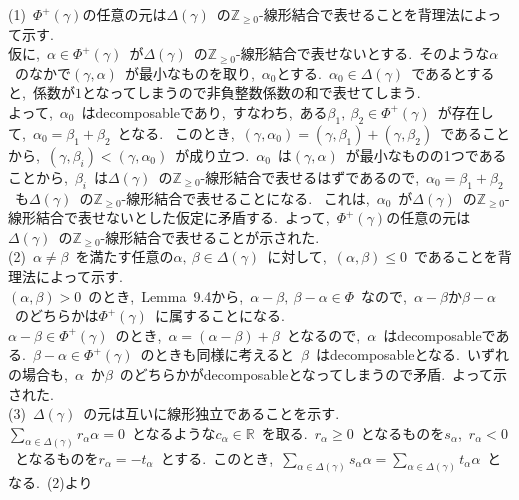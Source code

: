 \documentclass[uplatex,dvipdfmx]{jsarticle}
\begin{document}
\begin{myproof}
    (1)~$\Phi^+(\gamma)$の任意の元は$\Delta(\gamma)$~の$\mathbb{Z}_{\geq 0}$-線形結合で表せることを背理法によって示す.\\
    仮に,~$\alpha \in \Phi^+(\gamma)$~が$\Delta(\gamma)$~の$\mathbb{Z}_{\geq 0}$-線形結合で表せないとする.~そのような$\alpha$~のなかで$(\gamma,\alpha)$~が最小なものを取り,~$\alpha_0$とする.~$\alpha_0 \in \Delta(\gamma)$~であるとすると,~係数が$1$となってしまうので非負整数係数の和で表せてしまう.\\
    よって,~$\alpha_0$~はdecomposableであり,~すなわち,~ある$\beta_1,~\beta_2 \in \Phi^+(\gamma)$~が存在して,~$\alpha_0 = \beta_1 + \beta_2$~となる.~
    このとき,~$(\gamma, \alpha_0) = (\gamma, \beta_1) + (\gamma, \beta_2)$~であることから,~$(\gamma, \beta_i) < (\gamma, \alpha_0)$~が成り立つ.~$\alpha_0$~は$(\gamma,\alpha)$~が最小なものの1つであることから,~$\beta_i$~は$\Delta(\gamma)$~の$\mathbb{Z}_{\geq 0}$-線形結合で表せるはずであるので,~$\alpha_0 = \beta_1 + \beta_2$~も$\Delta(\gamma)$~の$\mathbb{Z}_{\geq 0}$-線形結合で表せることになる.~
    これは,~$\alpha_0$~が$\Delta(\gamma)$~の$\mathbb{Z}_{\geq 0}$-線形結合で表せないとした仮定に矛盾する.~よって,~$\Phi^+(\gamma)$の任意の元は$\Delta(\gamma)$~の$\mathbb{Z}_{\geq 0}$-線形結合で表せることが示された.\\
    (2)~$\alpha \neq \beta$~を満たす任意の$\alpha,~\beta \in \Delta(\gamma)$~に対して,~$(\alpha, \beta) \leq 0$~であることを背理法によって示す.\\
    $(\alpha, \beta) >0$~のとき,~Lemma~9.4から,~$\alpha -\beta,~\beta -\alpha \in \Phi$~なので,~$\alpha -\beta $か$\beta-\alpha$~のどちらかは$\Phi^+(\gamma)$~に属することになる.\\
    $\alpha - \beta \in \Phi^+(\gamma)$~のとき,~$\alpha = (\alpha - \beta) + \beta$~となるので,~$\alpha$~はdecomposableである.~$\beta - \alpha \in \Phi^+(\gamma)$~のときも同様に考えると~$\beta$~はdecomposableとなる.~いずれの場合も,~$\alpha$~か$\beta$~のどちらかがdecomposableとなってしまうので矛盾.~よって示された.\\
    (3)~$\Delta(\gamma)$~の元は互いに線形独立であることを示す.\\
    $\sum_{\alpha \in \Delta(\gamma)} r_\alpha \alpha = 0$~となるような$c_\alpha \in \mathbb{R}$~を取る.~$r_\alpha \geq 0$~となるものを$s_\alpha$,~$r_\alpha < 0$~となるものを$r_\alpha = -t_\alpha$~とする.~このとき,~$\sum_{\alpha \in \Delta(\gamma)} s_\alpha \alpha = \sum_{\alpha \in \Delta(\gamma)} t_\alpha \alpha$~となる.~(2)より
    \begin{equation*}

\end{equation*}
\end{myproof}
\end{document}
